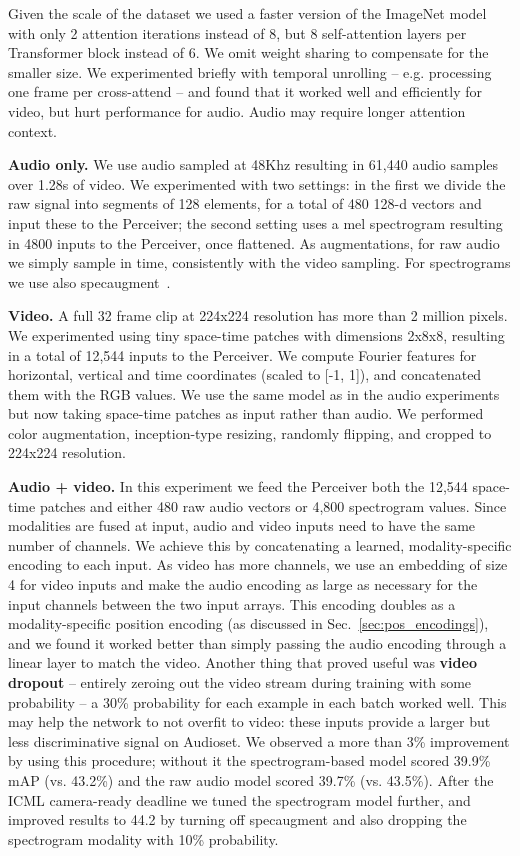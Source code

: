 \documentclass{article}
\begin{document}
Given the scale of the dataset we used a faster version of the ImageNet model with only 2 attention iterations instead of 8, but 8 self-attention layers per Transformer block instead of 6. We omit weight sharing to compensate for the smaller size. We experimented briefly with temporal unrolling -- e.g. processing one frame per cross-attend -- and found that it worked well and efficiently for video, but hurt performance for audio. Audio may require longer attention context.

\noindent \textbf{Audio only.} We use audio sampled at 48Khz resulting in 61,440 audio samples over 1.28s of video. We experimented with two settings: in the first we divide the raw signal into segments of 128 elements, for a total of 480 128-d vectors and input these to the Perceiver; the second setting uses a mel spectrogram resulting in 4800 inputs to the Perceiver, once flattened. As augmentations, for raw audio we simply sample in time, consistently with the video sampling. For spectrograms we use also  specaugment~\cite{park2019specaugment}.

\noindent \textbf{Video.} A full 32 frame clip at 224x224 resolution has more than 2 million pixels.  We experimented using tiny space-time patches with dimensions 2x8x8, resulting in a total of 12,544 inputs to the Perceiver. We compute Fourier features for horizontal, vertical and time coordinates (scaled to [-1, 1]), and concatenated them with the RGB values. We use the same model as in the audio experiments but now taking space-time patches as input rather than audio. We performed color augmentation, inception-type resizing, randomly flipping, and cropped to 224x224 resolution.

\noindent \textbf{Audio + video.} In this experiment we feed the Perceiver both the 12,544 space-time patches and either 480 raw audio vectors or 4,800 spectrogram values. Since modalities are fused at input, audio and video inputs need to have the same number of channels. We achieve this by concatenating a learned, modality-specific encoding to each input. As video has more channels, we use an embedding of size 4 for video inputs and make the audio encoding as large as necessary for the input channels between the two input arrays. This encoding doubles as a modality-specific position encoding (as discussed in Sec.~\ref{sec:pos_encodings}), and we found it worked better than simply passing the audio encoding through a linear layer to match the video. Another thing that proved useful was \textbf{video dropout} -- entirely zeroing out the video stream during training with some probability -- a 30\% probability for each example in each batch worked well. This may help the network to not overfit to video: these inputs provide a larger but less discriminative signal on Audioset. We observed a more than 3\% improvement by using this procedure; without it the spectrogram-based model scored 39.9\% mAP (vs. 43.2\%) and the raw audio model scored 39.7\% (vs. 43.5\%). After the ICML camera-ready deadline we tuned the spectrogram model further, and improved results to 44.2 by turning off specaugment and also dropping the spectrogram modality with 10\% probability.
\end{document}
